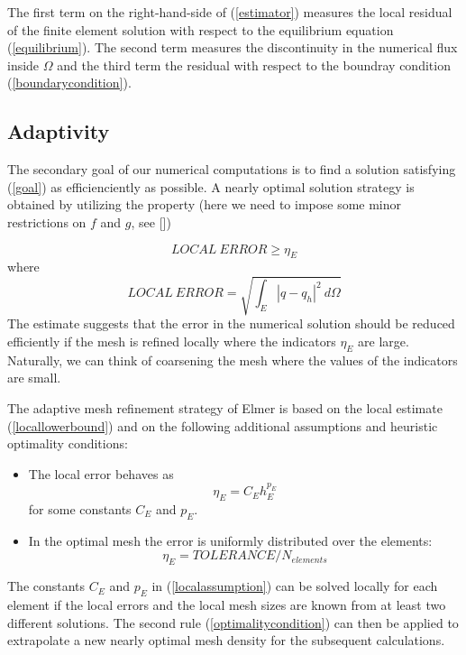 The first term on the right-hand-side of (\ref{estimator}) measures the
local residual of the finite element solution with respect to the equilibrium
equation (\ref{equilibrium}). The second term measures the discontinuity in
the numerical flux inside $\Omega$ and the third term the residual with respect
to the boundray condition (\ref{boundarycondition}).

\subsection{Adaptivity}

The secondary goal of our numerical computations is to find a solution
satisfying (\ref{goal}) as efficienciently as possible. A nearly optimal
solution strategy is obtained by utilizing the property (here we need to
impose some minor restrictions on $f$ and $g$, see [])

\begin{equation}
LOCAL \ ERROR \ge \eta_E \label{locallowerbound}
\end{equation}
where 
\begin{equation}
LOCAL \ ERROR = \sqrt{ \int_E |q-q_h|^2 \ d\Omega}
\end{equation}
The estimate suggests that the error in the numerical solution should
be reduced efficiently if the mesh is refined locally where the indicators
$\eta_E$ are large. Naturally, we can think of coarsening the mesh where
the values of the indicators are small.

The adaptive mesh refinement strategy of Elmer is based on the local
estimate (\ref{locallowerbound}) and on the following additional assumptions
and heuristic optimality conditions:
\begin{itemize}
\item The local error behaves as
\begin{equation}
\eta_E = C_E h_E^{p_E} \label{localassumption}
\end{equation}
for some constants $C_E$ and $p_E$.
\item In the optimal mesh the error is uniformly distributed over the elements:
\begin{equation}
\eta_E = TOLERANCE / N_{elements} \label{optimalitycondition}
\end{equation}
\end{itemize}

The constants $C_E$ and $p_E$ in (\ref{localassumption}) can be solved locally
for each element if the local errors and the local mesh sizes are known from
at least two different solutions. The second rule (\ref{optimalitycondition})
can then be applied to extrapolate a new nearly optimal mesh density for the
subsequent calculations. 

